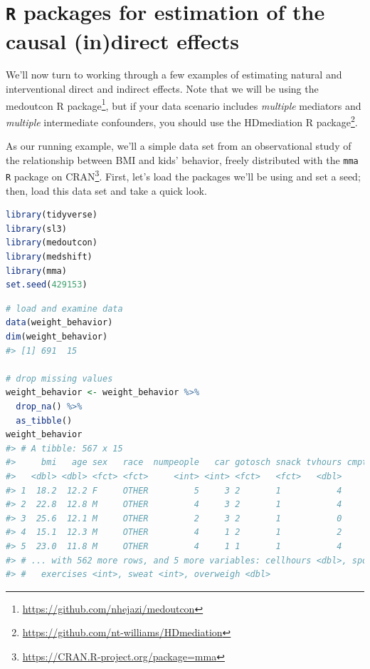 \documentclass[
  12pt,
]{book}
\newcommand{\passthrough}[1]{#1}
\renewcommand{\href}[2]{#2\footnote{\url{#1}}}
\theoremstyle{definition}
\theoremstyle{definition}
\theoremstyle{definition}
\newcommand{\1}{\mathbbm{1}}
\begin{document}
\hypertarget{r-packages-for-estimation-of-the-causal-indirect-effects}{%
\chapter{\texorpdfstring{\texttt{R} packages for estimation of the causal (in)direct effects}{R packages for estimation of the causal (in)direct effects}}\label{r-packages-for-estimation-of-the-causal-indirect-effects}}

We'll now turn to working through a few examples of estimating natural and
interventional direct and indirect effects. Note that we will be using the \href{https://github.com/nhejazi/medoutcon}{medoutcon R package}, but if your data scenario includes \emph{multiple} mediators and \emph{multiple} intermediate confounders, you should use the \href{https://github.com/nt-williams/HDmediation}{HDmediation R package}.

As our running
example, we'll a simple data set from an observational study of the relationship
between BMI and kids' behavior, freely distributed with the \href{https://CRAN.R-project.org/package=mma}{\passthrough{\lstinline!mma!} \passthrough{\lstinline!R!} package
on CRAN}. First, let's load the packages
we'll be using and set a seed; then, load this data set and take a quick look.

\begin{lstlisting}[language=R]
library(tidyverse)
library(sl3)
library(medoutcon)
library(medshift)
library(mma)
set.seed(429153)
\end{lstlisting}

\begin{lstlisting}[language=R]
# load and examine data
data(weight_behavior)
dim(weight_behavior)
#> [1] 691  15

# drop missing values
weight_behavior <- weight_behavior %>%
  drop_na() %>%
  as_tibble()
weight_behavior
#> # A tibble: 567 x 15
#>     bmi   age sex   race  numpeople   car gotosch snack tvhours cmpthours
#>   <dbl> <dbl> <fct> <fct>     <int> <int> <fct>   <fct>   <dbl>     <dbl>
#> 1  18.2  12.2 F     OTHER         5     3 2       1           4         0
#> 2  22.8  12.8 M     OTHER         4     3 2       1           4         2
#> 3  25.6  12.1 M     OTHER         2     3 2       1           0         2
#> 4  15.1  12.3 M     OTHER         4     1 2       1           2         1
#> 5  23.0  11.8 M     OTHER         4     1 1       1           4         3
#> # ... with 562 more rows, and 5 more variables: cellhours <dbl>, sports <fct>,
#> #   exercises <int>, sweat <int>, overweigh <dbl>
\end{lstlisting}
\end{document}
